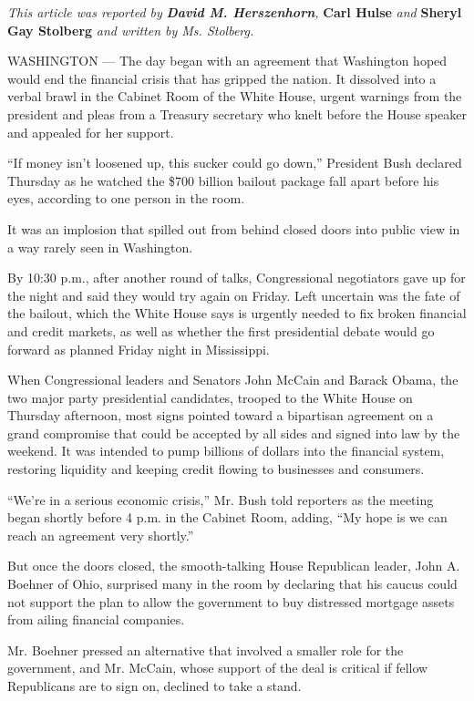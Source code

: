 \emph{This article was reported by} \emph{\emph{\textbf{David M.
Herszenhorn}},} \textbf{\textbf{Carl Hulse}} \emph{and}
\textbf{\textbf{Sheryl Gay Stolberg}} \emph{and written by Ms.
Stolberg.}

WASHINGTON --- The day began with an agreement that Washington hoped
would end the financial crisis that has gripped the nation. It dissolved
into a verbal brawl in the Cabinet Room of the White House, urgent
warnings from the president and pleas from a Treasury secretary who
knelt before the House speaker and appealed for her support.

``If money isn't loosened up, this sucker could go down,'' President
Bush declared Thursday as he watched the \$700 billion bailout package
fall apart before his eyes, according to one person in the room.

It was an implosion that spilled out from behind closed doors into
public view in a way rarely seen in Washington.

By 10:30 p.m., after another round of talks, Congressional negotiators
gave up for the night and said they would try again on Friday. Left
uncertain was the fate of the bailout, which the White House says is
urgently needed to fix broken financial and credit markets, as well as
whether the first presidential debate would go forward as planned Friday
night in Mississippi.

When Congressional leaders and Senators John McCain and Barack Obama,
the two major party presidential candidates, trooped to the White House
on Thursday afternoon, most signs pointed toward a bipartisan agreement
on a grand compromise that could be accepted by all sides and signed
into law by the weekend. It was intended to pump billions of dollars
into the financial system, restoring liquidity and keeping credit
flowing to businesses and consumers.

``We're in a serious economic crisis,'' Mr. Bush told reporters as the
meeting began shortly before 4 p.m. in the Cabinet Room, adding, ``My
hope is we can reach an agreement very shortly.''

But once the doors closed, the smooth-talking House Republican leader,
John A. Boehner of Ohio, surprised many in the room by declaring that
his caucus could not support the plan to allow the government to buy
distressed mortgage assets from ailing financial companies.

Mr. Boehner pressed an alternative that involved a smaller role for the
government, and Mr. McCain, whose support of the deal is critical if
fellow Republicans are to sign on, declined to take a stand.

